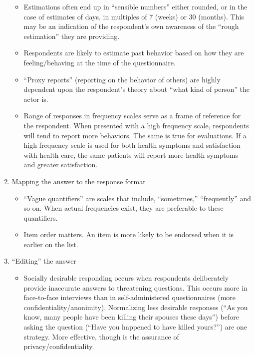 \documentclass[
  english,
]{book}
\providecommand{\tightlist}{%
  \setlength{\itemsep}{0pt}\setlength{\parskip}{0pt}}
\begin{document}
\begin{enumerate}
  \begin{itemize}
  \tightlist
  \item
    Estimations often end up in ``sensible numbers'' either rounded, or in the case of estimates of days, in multiples of 7 (weeks) or 30 (months). This may be an indication of the respondent's own awareness of the ``rough estimation'' they are providing.
  \item
    Respondents are likely to estimate past behavior based on how they are feeling/behaving at the time of the questionnaire.
  \item
    ``Proxy reports'' (reporting on the behavior of others) are highly dependent upon the respondent's theory about ``what kind of person'' the actor is.
  \item
    Range of responses in frequency scales serve as a frame of reference for the respondent. When presented with a high frequency scale, respondents will tend to report more behaviors. The same is true for evaluations. If a high frequency scale is used for both health symptoms and satisfaction with health care, the same patients will report more health symptoms and greater satisfaction.
  \end{itemize}
\item
  Mapping the answer to the response format

  \begin{itemize}
  \tightlist
  \item
    ``Vague quantifiers'' are scales that include, ``sometimes,'' ``frequently'' and so on. When actual frequencies exist, they are preferable to these quantifiers.
  \item
    Item order matters. An item is more likely to be endorsed when it is earlier on the list.
  \end{itemize}
\item
  ``Editing'' the answer

  \begin{itemize}
  \tightlist
  \item
    Socially desirable responding occurs when respondents deliberately provide inaccurate answers to threatening questions. This occurs more in face-to-face interviews than in self-administered questionnaires (more confidentiality/anonimity). Normalizing less desirable responses (``As you know, many people have been killing their spouses these days'') before asking the question (``Have you happened to have killed yours?'') are one strategy. More effective, though is the assurance of privacy/confidentiality.
  \end{itemize}
\end{enumerate}
\end{document}
